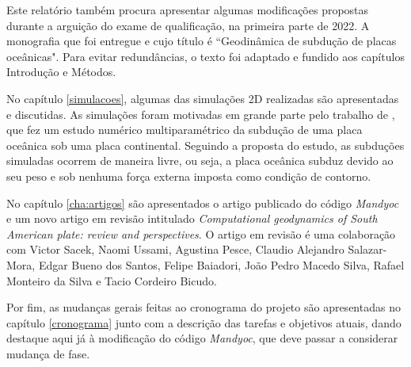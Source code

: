 
Este relatório também procura apresentar algumas modificações propostas durante a arguição do exame de qualificação, na primeira parte de 2022. A monografia que foi entregue e cujo título é ``Geodinâmica de subdução de placas oceânicas". Para evitar redundâncias, o texto foi adaptado e fundido aos capítulos Introdução e Métodos.

No capítulo \ref{simulacoes}, algumas das simulações 2D realizadas são apresentadas e discutidas. As simulações foram motivadas em grande parte pelo trabalho de \cite{strak2021thermo}, que fez um estudo numérico multiparamétrico da subdução de uma placa oceânica sob uma placa continental. Seguindo a proposta do estudo, as subduções simuladas ocorrem de maneira livre, ou seja, a placa oceânica subduz devido ao seu peso e sob nenhuma força externa imposta como condição de contorno.

No capítulo \ref{cha:artigos} são apresentados o artigo publicado do código \textit{Mandyoc} e um novo artigo em revisão intitulado \textit{Computational geodynamics of South American plate: review and perspectives}. O artigo em revisão é uma colaboração com Victor Sacek, Naomi Ussami, Agustina Pesce, Claudio Alejandro Salazar-Mora, Edgar Bueno dos Santos, Felipe Baiadori, João Pedro Macedo Silva, Rafael Monteiro da Silva e Tacio Cordeiro Bicudo.

Por fim, as mudanças gerais feitas ao cronograma do projeto são apresentadas no capítulo \ref{cronograma} junto com a descrição das tarefas e objetivos atuais, dando destaque aqui já à modificação do código \textit{Mandyoc}, que deve passar a considerar mudança de fase.

